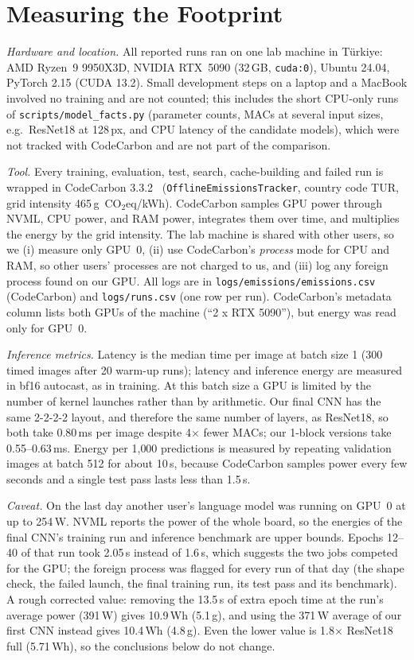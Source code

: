 \documentclass[conference,a4paper]{IEEEtran}
\newcommand{\cotwoeq}{CO$_2$eq}
\begin{document}
\section{Measuring the Footprint}
\label{sec:footprint}
\emph{Hardware and location.} All reported runs ran on one lab machine in T\"urkiye: AMD Ryzen~9 9950X3D, NVIDIA RTX~5090 (32\,GB, \texttt{cuda:0}), Ubuntu 24.04, PyTorch 2.15 (CUDA 13.2). Small development steps on a laptop and a MacBook involved no training and are not counted; this includes the short CPU-only runs of \texttt{scripts/model\_facts.py} (parameter counts, MACs at several input sizes, e.g.\ ResNet18 at 128\,px, and CPU latency of the candidate models), which were not tracked with CodeCarbon and are not part of the comparison.

\emph{Tool.} Every training, evaluation, test, search, cache-building and failed run is wrapped in CodeCarbon 3.3.2~\cite{codecarbon} (\texttt{OfflineEmissionsTracker}, country code TUR, grid intensity 465\,g~\cotwoeq/kWh). CodeCarbon samples GPU power through NVML, CPU power, and RAM power, integrates them over time, and multiplies the energy by the grid intensity. The lab machine is shared with other users, so we (i) measure only GPU~0, (ii) use CodeCarbon's \emph{process} mode for CPU and RAM, so other users' processes are not charged to us, and (iii) log any foreign process found on our GPU. All logs are in \texttt{logs/emissions/emissions.csv} (CodeCarbon) and \texttt{logs/runs.csv} (one row per run). CodeCarbon's metadata column lists both GPUs of the machine (``2 x RTX 5090''), but energy was read only for GPU~0.

\emph{Inference metrics.} Latency is the median time per image at batch size 1 (300 timed images after 20 warm-up runs); latency and inference energy are measured in bf16 autocast, as in training. At this batch size a GPU is limited by the number of kernel launches rather than by arithmetic. Our final CNN has the same 2-2-2-2 layout, and therefore the same number of layers, as ResNet18, so both take 0.80\,ms per image despite 4$\times$ fewer MACs; our 1-block versions take 0.55--0.63\,ms. Energy per 1{,}000 predictions is measured by repeating validation images at batch 512 for about 10\,s, because CodeCarbon samples power every few seconds and a single test pass lasts less than 1.5\,s.

\emph{Caveat.} On the last day another user's language model was running on GPU~0 at up to 254\,W. NVML reports the power of the whole board, so the energies of the final CNN's training run and inference benchmark are upper bounds. Epochs 12--40 of that run took 2.05\,s instead of 1.6\,s, which suggests the two jobs competed for the GPU; the foreign process was flagged for every run of that day (the shape check, the failed launch, the final training run, its test pass and its benchmark). A rough corrected value: removing the 13.5\,s of extra epoch time at the run's average power (391\,W) gives 10.9\,Wh (5.1\,g), and using the 371\,W average of our first CNN instead gives 10.4\,Wh (4.8\,g). Even the lower value is 1.8$\times$ ResNet18 full (5.71\,Wh), so the conclusions below do not change.
\end{document}
